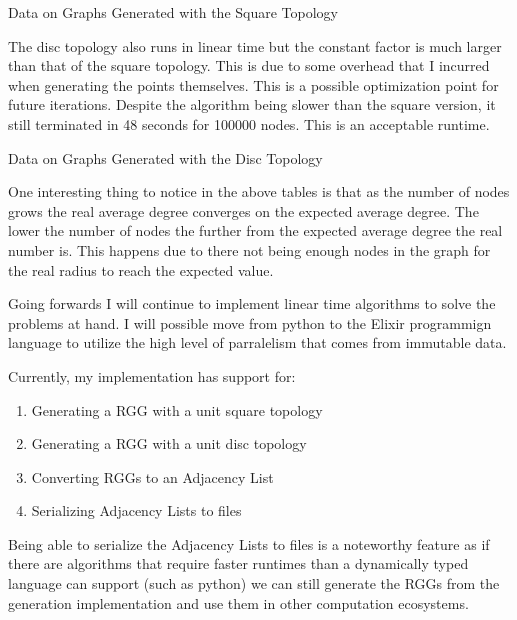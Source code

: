 \documentclass{article}
\begin{document}
	\begin{center}
	  \begin{table}[H]
			\caption{Data on Graphs Generated with the Square Topology}
		\end{table}
	\end{center}

	The disc topology also runs in linear time but the constant factor is much larger than that of the square topology.
	This is due to some overhead that I incurred when generating the points themselves.
	This is a possible optimization point for future iterations.
	Despite the algorithm being slower than the square version, it still terminated in 48 seconds for 100000 nodes.
	This is an acceptable runtime.

  \begin{center}
	  \begin{table}[H]
			\caption{Data on Graphs Generated with the Disc Topology}
		\end{table}
	\end{center}

	One interesting thing to notice in the above tables is that as the number of nodes grows the real average degree converges on the expected average degree.
	The lower the number of nodes the further from the expected average degree the real number is.
	This happens due to there not being enough nodes in the graph for the real radius to reach the expected value.

	Going forwards I will continue to implement linear time algorithms to solve the problems at hand.
	I will possible move from python to the Elixir programmign language to utilize the high level of parralelism that comes from immutable data.

  Currently, my implementation has support for:
  \begin{enumerate}
		\item Generating a RGG with a unit square topology
		\item Generating a RGG with a unit disc topology
		\item Converting RGGs to an Adjacency List
		\item Serializing Adjacency Lists to files
  \end{enumerate}
  Being able to serialize the Adjacency Lists to files is a noteworthy feature as if there are algorithms that require faster runtimes than a dynamically typed language can support (such as python) we can still generate the RGGs from the generation implementation  and use them in other computation ecosystems.
\end{document}
